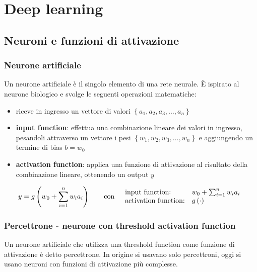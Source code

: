 \section{Deep learning}
\subsection{Neuroni e funzioni di attivazione}
\subsubsection*{Neurone artificiale}
Un neurone artificiale è il singolo elemento di una rete neurale. È ispirato al neurone biologico e svolge le seguenti
operazioni matematiche:
\begin{itemize}
	\item riceve in ingresso un vettore di valori \(\left\{ a_1, a_2, a_3, \dots, a_n \right\}\)
	\item \textbf{input function}: effettua una combinazione lineare dei valori in ingresso, pesandoli attraverso un vettore 
	i pesi \(\left\{ w_1, w_2, w_3, \dots, w_n \right\}\) e aggiungendo un termine di bias \(b = w_0\)
	\item \textbf{activation function}: applica una funzione di attivazione al risultato della combinazione lineare, ottenendo
	un output \(y\)
\end{itemize}
\[y = g\left( w_0 + \sum_{i=1}^{n} w_i a_i \right) \qquad \text{con} \quad \begin{array}{l l}
	\text{input function:} & w_0 + \sum_{i=1}^{n} w_i a_i \\
	\text{activation function:} & g\left( \cdot \right)
\end{array}\]

\subsubsection*{Percettrone - neurone con threshold activation function}
Un neurone artificiale che utilizza una threshold function come funzione di attivazione è detto percettrone. In origine si
usavano solo percettroni, oggi si usano neuroni con funzioni di attivazione più complesse.


